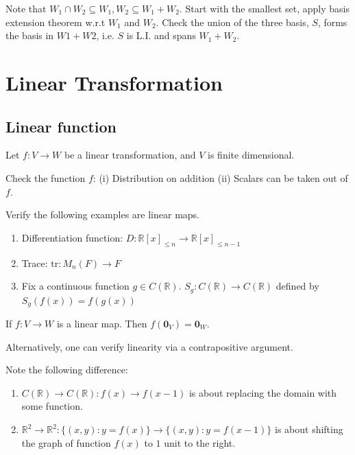 \documentclass[12pt]{article}
\begin{document}
\begin{tcolorbox}[boxrule=0.5pt]
    \begin{pf}
    Note that $W_1\cap W_2\subseteq W_1, W_2\subseteq W_1+W_2$.
    Start with the smallest set, apply basis extension theorem w.r.t $W_1$ and $W_2$. Check the union of the three basis, $S$, forms the basis in $W1+W2$,
    i.e. $S$ is L.I. and spans $W_1+W_2$.
    \end{pf}
\end{tcolorbox}


\newpage
\section{Linear Transformation}
\subsection{Linear function}

Let $f:V\rightarrow W$ be a linear transformation, and $V$ is finite dimensional.

\begin{definition}
Check the function $f$: (i) Distribution on addition (ii) Scalars can be taken out of $f$.
\end{definition}

\begin{example}
    Verify the following examples are linear maps.
    \begin{enumerate}
        \item Differentiation function: $D: \mathbb{R}[x]_{\leq n} \rightarrow \mathbb{R}[x]_{\leq n-1}$
        \item Trace: $\text{tr}: M_n(F) \rightarrow F$
        \item Fix a continuous function $g\in C(\mathbb{R})$. $S_g: C(\mathbb{R}) \rightarrow  C(\mathbb{R}) $ defined by $S_g(f(x))=f(g(x))$
    \end{enumerate}
\end{example}

\begin{theorem}
If $f:V\rightarrow W$ is a linear map. Then $f(\mathbf{0}_V)=\mathbf{0}_W$.
\end{theorem}
Alternatively, one can verify linearity via a contrapositive argument. 


\begin{pbox}
\begin{remark}
Note the following difference:
\begin{enumerate}
    \item $C(\mathbb{R}) \rightarrow  C(\mathbb{R}): f(x)\rightarrow f(x-1)$ is about replacing the domain with some function.
    \item $\mathbb{R}^2\rightarrow\mathbb{R}^2: \{(x,y): y=f(x)\}\rightarrow \{(x,y): y=f(x-1)\}$ is about shifting the graph of function $f(x)$ to $1$ unit to the right.
\end{enumerate}
\end{remark}
\end{pbox}
\end{document}
